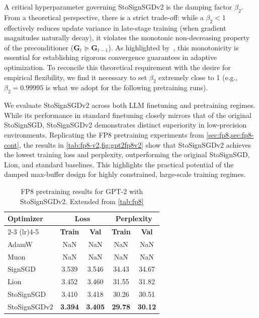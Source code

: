 \documentclass{article}
\def \Gb {\mathbf{G}}
\begin{document}
A critical hyperparameter governing StoSignSGDv2 is the damping factor $\beta_2$. From a theoretical perspective, there is a strict trade-off: while a $\beta_2 < 1$ effectively reduces update variance in late-stage training (when gradient magnitudes naturally decay), it violates the monotonic non-decreasing property of the preconditioner ($\Gb_t \succeq \Gb_{t-1}$). As highlighted by~\citet{reddi2018convergence}, this monotonicity is essential for establishing rigorous convergence guarantees in adaptive optimization. To reconcile this theoretical requirement with the desire for empirical flexibility, we find it necessary to set $\beta_2$ extremely close to 1 (e.g., $\beta_2 = 0.99995$ is what we adopt for the following pretraining runs).

We evaluate StoSignSGDv2 across both LLM finetuning and pretraining regimes. While its performance in standard finetuning closely mirrors that of the original StoSignSGD, StoSignSGDv2 demonstrates distinct superiority in low-precision environments. Replicating the FP8 pretraining experiments from \cref{sec:fp8,sec:fp8-cont}, the results in \cref{tab:fp8-v2,fig:gpt2fp8v2} show that StoSignSGDv2 achieves the lowest training loss and perplexity, outperforming the original StoSignSGD, Lion, and standard baselines. This highlights the practical potential of the damped max-buffer design for highly constrained, large-scale training regimes.

\begin{table}
    \centering   
    \caption{FP8 pretraining results for GPT-2 with StoSignSGDv2. Extended from \cref{tab:fp8}\label{tab:fp8-v2}}

    \begin{tabular}{lcccc}
        \toprule
        \multirow{2}{*}{\textbf{Optimizer}} & \multicolumn{2}{c}{\textbf{Loss}} & \multicolumn{2}{c}{\textbf{Perplexity}} \\
        \cmidrule(lr){2-3} \cmidrule(lr){4-5}
        & \textbf{Train} & \textbf{Val} & \textbf{Train} & \textbf{Val} \\
        \midrule
        AdamW      & NaN   & NaN   & NaN   & NaN   \\
        Muon       & NaN   & NaN   & NaN   & NaN   \\
        SignSGD    & 3.539 & 3.546 & 34.43 & 34.67 \\
        Lion       & 3.452 & 3.460 & 31.55 & 31.82 \\
        StoSignSGD & 3.410 & 3.418 & 30.26 & 30.51 \\
        StoSignSGDv2 & \textbf{3.394} & \textbf{3.405} & \textbf{29.78} & \textbf{30.12} \\
        \bottomrule
    \end{tabular}
    \vspace{-10pt} 
\end{table}
\end{document}
